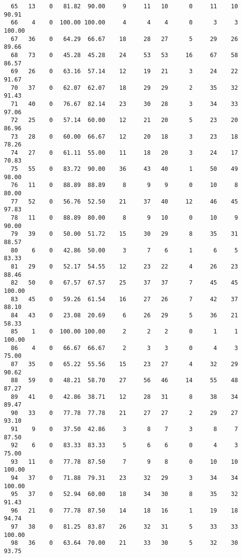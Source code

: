 \begin{verbatim}
  65   13    0   81.82  90.00     9     11   10      0     11    10    90.91
  66    4    0  100.00 100.00     4      4    4      0      3     3   100.00
  67   36    0   64.29  66.67    18     28   27      5     29    26    89.66
  68   73    0   45.28  45.28    24     53   53     16     67    58    86.57
  69   26    0   63.16  57.14    12     19   21      3     24    22    91.67
  70   37    0   62.07  62.07    18     29   29      2     35    32    91.43
  71   40    0   76.67  82.14    23     30   28      3     34    33    97.06
  72   25    0   57.14  60.00    12     21   20      5     23    20    86.96
  73   28    0   60.00  66.67    12     20   18      3     23    18    78.26
  74   27    0   61.11  55.00    11     18   20      3     24    17    70.83
  75   55    0   83.72  90.00    36     43   40      1     50    49    98.00
  76   11    0   88.89  88.89     8      9    9      0     10     8    80.00
  77   52    0   56.76  52.50    21     37   40     12     46    45    97.83
  78   11    0   88.89  80.00     8      9   10      0     10     9    90.00
  79   39    0   50.00  51.72    15     30   29      8     35    31    88.57
  80    6    0   42.86  50.00     3      7    6      1      6     5    83.33
  81   29    0   52.17  54.55    12     23   22      4     26    23    88.46
  82   50    0   67.57  67.57    25     37   37      7     45    45   100.00
  83   45    0   59.26  61.54    16     27   26      7     42    37    88.10
  84   43    0   23.08  20.69     6     26   29      5     36    21    58.33
  85    1    0  100.00 100.00     2      2    2      0      1     1   100.00
  86    4    0   66.67  66.67     2      3    3      0      4     3    75.00
  87   35    0   65.22  55.56    15     23   27      4     32    29    90.62
  88   59    0   48.21  58.70    27     56   46     14     55    48    87.27
  89   41    0   42.86  38.71    12     28   31      8     38    34    89.47
  90   33    0   77.78  77.78    21     27   27      2     29    27    93.10
  91    9    0   37.50  42.86     3      8    7      3      8     7    87.50
  92    6    0   83.33  83.33     5      6    6      0      4     3    75.00
  93   11    0   77.78  87.50     7      9    8      0     10    10   100.00
  94   37    0   71.88  79.31    23     32   29      3     34    34   100.00
  95   37    0   52.94  60.00    18     34   30      8     35    32    91.43
  96   21    0   77.78  87.50    14     18   16      1     19    18    94.74
  97   38    0   81.25  83.87    26     32   31      5     33    33   100.00
  98   36    0   63.64  70.00    21     33   30      5     32    30    93.75

\end{verbatim}
